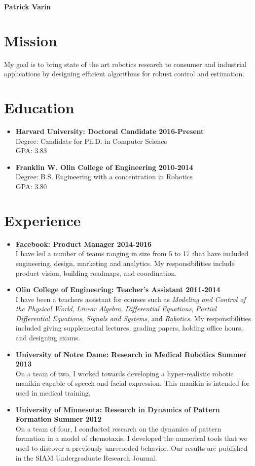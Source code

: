 \documentclass{article}
\newcommand{\name}[1]{\begin{center}\LARGE\textbf{#1}\end{center}}
\newcommand{\newitem}[2]{\item \textbf{ #1 \hfill #2}\\}
\begin{document}
\name{Patrick Varin}
\justify
\section*{Mission}
My goal is to bring state of the art robotics research to consumer and industrial applications by designing efficient algorithms for robust control and estimation.

\section*{Education}
\begin{itemize}
\newitem{Harvard University: Doctoral Candidate}{2016-Present}
Degree: Candidate for Ph.D. in Computer Science\\
GPA: 3.83

\newitem{Franklin W. Olin College of Engineering}{2010-2014}
Degree: B.S. Engineering with a concentration in Robotics\\
GPA: 3.80

\end{itemize}
\section*{Experience}
\begin{itemize}
\newitem{Facebook: Product Manager}{2014-2016}
I have led a number of teams ranging in size from 5 to 17 that have included engineering, design, marketing and analytics. My responsibilities include product vision, building roadmaps, and coordination.

\newitem{Olin College of Engineering: Teacher's Assistant}{2011-2014}
I have been a teachers assistant for courses such as \emph{Modeling and Control of the Physical World}, \emph{Linear Algebra}, \emph{Differential Equations}, \emph{Partial Differential Equations}, \emph{Signals and Systems}, and \emph{Robotics}. My responsibilities included giving supplemental lectures, grading papers, holding office hours, and designing exams.

\newitem{University of Notre Dame: Research in Medical Robotics}{Summer 2013}
On a team of two, I worked towards developing a hyper-realistic robotic manikin capable of speech and facial expression. This manikin is intended for used in medical training.

\newitem{University of Minnesota: Research in Dynamics of Pattern Formation}{Summer 2012}
On a team of four, I conducted research on the dynamics of pattern formation in a model of chemotaxis. I developed the numerical tools that we used to discover a previously unrecorded behavior. Our results are published in the SIAM Undergraduate Research Journal.
\end{itemize}
\end{document}
